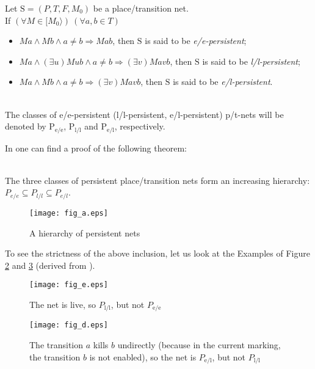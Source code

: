 \documentclass[a4paper]{llncs}
\begin{document}
\begin{definition}
\label{d31}
Let $\mathrm{S}=(P,T,F,M_0)$ be a place/transition net. \\
If  $(\forall M \in [M_0\rangle)\ (\forall a,b \in T)$
\begin{itemize}
\item $Ma \land Mb \land a\neq b \Rightarrow Mab$, then $\mathrm{S}$ is said to be \emph{e/e-persistent};
\item $Ma \land (\exists u) Mub \land a\neq b \Rightarrow (\exists v) Mavb$, then $\mathrm{S}$ is said to be \emph{l/l-persistent};
\item $Ma \land Mb \land a\neq b \Rightarrow (\exists v) Mavb$, then $\mathrm{S}$ is said to be \emph{e/l-persistent}.
\end{itemize}\mbox{}\\
The classes of e/e-persistent (l/l-persistent, e/l-persistent) p/t-nets will be denoted by $\mathrm{P}_{\mathrm{e/e}}$, $\mathrm{P}_{\mathrm{l/l}}$ and $\mathrm{P}_{\mathrm{e/l}}$, respectively.
\end{definition}
In \cite{BarOch} one can find a proof of the following theorem:
\begin{theorem}\mbox{}\\
\label{t_hier}
The three classes of persistent place/transition nets
form an increasing hierarchy: $P_{e/e}\subseteq P_{l/l}\subseteq P_{e/l}$.
\end{theorem}
\begin{figure}[h]
\centering
\texttt{[image: fig\_a.eps]}
\caption{A hierarchy of persistent nets}
\label{FigA}
\end{figure}
\begin{example}
\label{ex_fig_e_d}
To see the strictness of the above inclusion, let us look at the Examples of Figure \ref{Fig_E} and \ref{Fig_D} (derived from \cite{BarOch}).
\end{example}
\begin{figure}[h]
\centering
\texttt{[image: fig\_e.eps]}
\caption{The net is live, so $P_{\mathrm{l/l}}$, but not $P_{\mathrm{e/e}}$ }
\label{Fig_E}
\end{figure}
\begin{figure}[h]
\centering
\texttt{[image: fig\_d.eps]}
\caption{The transition $a$ kills $b$ undirectly (because in the current marking, the transition $b$ is not enabled), so the net is $P_{\mathrm{e/l}}$, but not $P_\mathrm{{l/l}}$ }
\label{Fig_D}
\end{figure}
\end{document}
